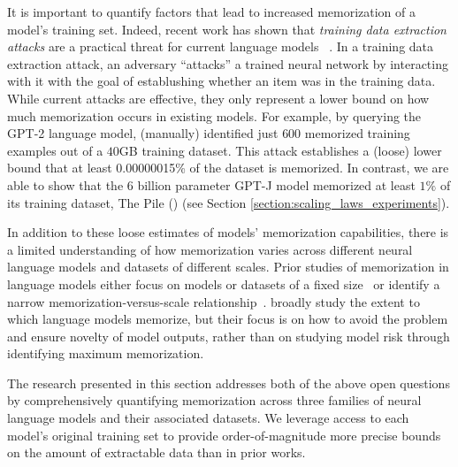 It is important to  quantify factors that lead to increased memorization of a model's training set.
%
Indeed, recent work has shown that \emph{training data extraction attacks} are a practical threat for current language models ~\citep{carlini2020extracting}.
In a training data extraction attack, an adversary ``attacks'' a trained neural network by interacting with it with the goal of establushing whether an item was in the training data.
While current attacks are effective, they only represent a lower bound on how much memorization occurs in existing models.
%
For example, by querying
the GPT-2 language model, \citet{carlini2020extracting} (manually) identified just $600$ memorized training examples out of a $40$GB training dataset.
%
This attack establishes a (loose) lower bound that at least
0.00000015\%
of the dataset is memorized. %
% 
In contrast, we are able to show that the 6 billion parameter 
GPT-J model \citep{gpt-neo,gpt-j} memorized at least $1\%$ of its training dataset, The Pile (\cite{gao2020pile}) (see Section \ref{section:scaling_laws_experiments}).

In addition to these loose estimates of models' memorization capabilities, there is a limited understanding of how memorization varies across different neural language models and datasets of different scales.
%
Prior studies of memorization in language models either focus on models or datasets of a fixed size~\citep{carlini2019secret, zhang2021counterfactual, thakkar2020understanding} or identify a narrow memorization-versus-scale relationship~\citep{carlini2020extracting, lee2021deduplicating}.
\citet{mccoy2021raven} broadly study the extent to which language models memorize, but their focus is on how to avoid the problem and ensure novelty of model outputs, rather than on studying model risk through identifying maximum memorization.

The research presented in this section addresses both of the above open questions by 
comprehensively quantifying memorization across three families of neural language models and their associated datasets.
%
We leverage access to each model's original training set to provide order-of-magnitude more precise bounds on the amount of extractable data than in prior works.

